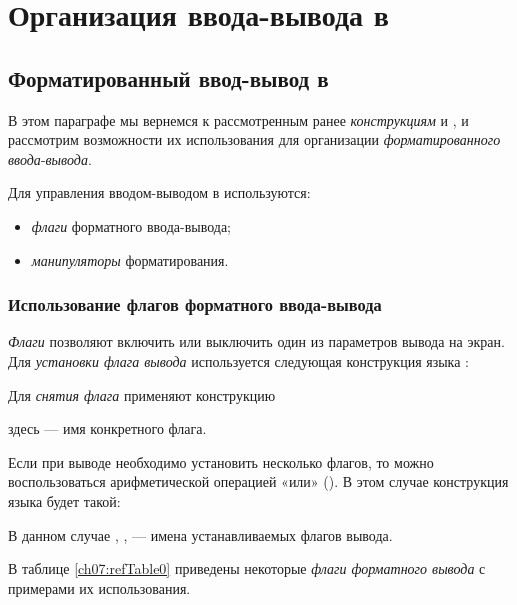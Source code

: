 \chapter[Организация ввода-вывода в \Sys{C++}]{Организация ввода-вывода в }
\section[Форматированный ввод-вывод в \Sys{C++}]{Форматированный ввод-вывод в }
В этом параграфе мы вернемся к рассмотренным ранее \emph{конструкциям}  и
, и рассмотрим возможности их использования для организации \emph{форматированного 
}\emph{ввода}-\emph{вывода}.


Для управления вводом-выводом в  используются:

\begin{itemize}
\item \emph{флаги} форматного ввода-вывода;
\item \emph{манипуляторы} форматирования.
\end{itemize}

\subsection[Использование флагов форматного ввода-вывода]{Использование флагов форматного ввода-вывода}
\label{ch07:1.1}
\emph{Флаги} позволяют включить или выключить один из параметров вывода
на экран. Для \emph{установки флага вывода} используется следующая конструкция языка
:


Для \emph{снятия флага} применяют конструкцию 


здесь  --- имя конкретного флага.

Если при выводе необходимо установить несколько флагов, то можно воспользоваться арифметической операцией «или»
(\Sys{\textbar}). В этом случае конструкция языка  будет такой:


В данном случае , ,  --- имена устанавливаемых
флагов вывода.

В таблице \ref{ch07:refTable0} приведены некоторые \emph{флаги форматного вывода} с примерами их
использования. 


